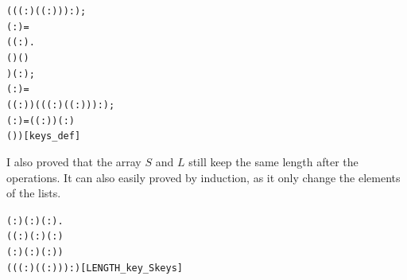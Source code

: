 \documentclass{article}
\begin{document}
\begin{alltt}
            ((( :) \HOLSymConst{\HOLTokenProd{}} ( \HOLSymConst{\ensuremath{+}} ( :))) :);
        ( : ) =
            (\HOLTokenLambda{}( :).
                   \HOLSymConst{=}  
                   (   \HOLSymConst{\ensuremath{+}}  \HOLSymConst{\ensuremath{+}} ) \HOLSymConst{\HOLTokenRol{}}  ( \HOLSymConst{\ensuremath{+}} )
                    ) ( :);
        ( :) =
          ( \HOLSymConst{\ensuremath{+}} ( :))  ((( :) \HOLSymConst{\HOLTokenProd{}} ( \HOLSymConst{\ensuremath{+}} ( :))) :);
        ( :) = ( \HOLSymConst{\ensuremath{+}} ( :))  ( :)
        (\HOLSymConst{,}\HOLSymConst{,}\HOLSymConst{,}\HOLSymConst{,}\HOLSymConst{,}))\hfill{[keys_def]}
\end{alltt}

I also proved that the array $S$ and $L$ still keep the same length after the operations. It can also easily proved by induction,
as it only change the elements of the lists.

\begin{alltt}
\HOLTokenTurnstile{} \HOLSymConst{\HOLTokenForall{}}( :) ( :) ( :).
     (( :)\HOLSymConst{,}( :)\HOLSymConst{,}( : )\HOLSymConst{,}
      ( : )\HOLSymConst{,}( :)\HOLSymConst{,}( :)) \HOLSymConst{=}
         \HOLSymConst{\HOLTokenImp{}}
       \HOLSymConst{=} ((( :) \HOLSymConst{\HOLTokenProd{}} ( \HOLSymConst{\ensuremath{+}} ( :))) :)\hfill{[LENGTH_key_Skeys]}
\end{alltt}
\end{document}
